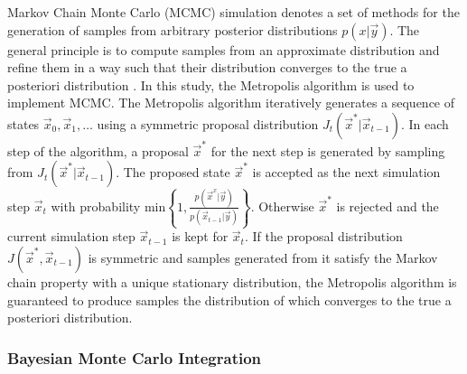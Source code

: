 \documentclass[journal abbreviation, manuscript]{copernicus}
\begin{document}
Markov Chain Monte Carlo (MCMC) simulation denotes a set of methods for the
generation of samples from arbitrary posterior distributions $p(x | \vec{y})$.
The general principle is to compute samples from an approximate distribution and
refine them in a way such that their distribution converges to the true a
posteriori distribution \citep{bda}. In this study, the Metropolis algorithm is
used to implement MCMC. The Metropolis algorithm iteratively generates a
sequence of states $\vec{x}_0, \vec{x}_1, \ldots$ using a symmetric proposal
distribution $J_t(\vec{x}^* | \vec{x}_{t-1})$. In each step of the algorithm, a
proposal $\vec{x}^*$ for the next step is generated by sampling from
$J_t(\vec{x}^* | \vec{x}_{t-1})$. The proposed state $\vec{x}^*$ is accepted as
the next simulation step $\vec{x}_t$ with probability $\text{min} \left \{1,
\frac{p(\vec{x}^x | \vec{y})}{p(\vec{x}_{t-1} | \vec{y})} \right \}$. Otherwise
$\vec{x}^*$ is rejected and the current simulation step $\vec{x}_{t-1}$ is kept
for $\vec{x}_t$. If the proposal distribution $J(\vec{x}^*, \vec{x}_{t-1})$ is
symmetric and samples generated from it satisfy the Markov chain property with a
unique stationary distribution, the Metropolis algorithm is guaranteed to
produce samples the distribution of which converges to the true a posteriori
distribution.

\subsubsection{Bayesian Monte Carlo Integration}
\end{document}

